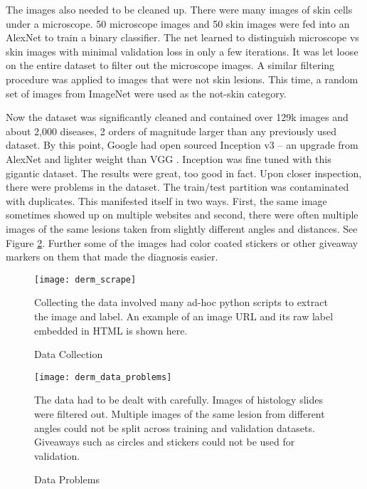The images also needed to be cleaned up.  There were many images of skin cells under a microscope.  50 microscope images and 50 skin images were fed into an AlexNet to train a binary classifier.  The net learned to distinguish microscope vs skin images with minimal validation loss in only a few iterations.  It was let loose on the entire dataset to filter out the microscope images.  A similar filtering procedure was applied to images that were not skin lesions.  This time, a random set of images from ImageNet were used as the not-skin category.

Now the dataset was significantly cleaned and contained over 129k images and about 2,000 diseases, 2 orders of magnitude larger than any previously used dataset.  By this point, Google had open sourced Inception v3 \cite{szegedy2016rethinking} -- an upgrade from AlexNet \cite{krizhevsky2012imagenet} and lighter weight than VGG \cite{simonyan2014very}.  Inception was fine tuned with this gigantic dataset.  The results were great, too good in fact.  Upon closer inspection, there were problems in the dataset.  The train/test partition was contaminated with duplicates.  This manifested itself in two ways.  First, the same image sometimes showed up on multiple websites and second, there were often multiple images of the same lesions taken from slightly different angles and distances.  See Figure \ref{fig:derm_data_problems}.  Further some of the images had color coated stickers or other giveaway markers on them that made the diagnosis easier.

\begin{figure}
\texttt{[image: derm\_scrape]}
\caption{Data Collection}
\vspace{12px}
Collecting the data involved many ad-hoc python scripts to extract the image and label.  An example of an image URL and its raw label embedded in HTML is shown here.
\label{fig:derm_scrape}
\end{figure}

\begin{figure}
\texttt{[image: derm\_data\_problems]}
\caption{Data Problems}
\vspace{12px}
The data had to be dealt with carefully.  Images of histology slides were filtered out.  Multiple images of the same lesion from different angles could not be split across training and validation datasets.  Giveaways such as circles and stickers could not be used for validation.
\label{fig:derm_data_problems}
\end{figure}


